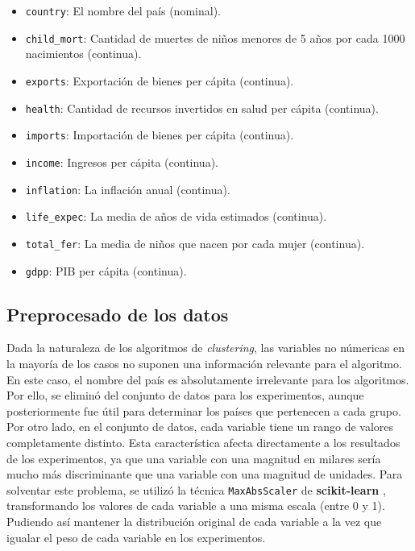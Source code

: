 \documentclass{article}
\begin{document}
\begin{itemize}
  \item \verb|country|: El nombre del país (nominal).
  \item \verb|child_mort|: Cantidad de muertes de niños menores de 5 años por cada 1000 nacimientos (continua).
  \item \verb|exports|: Exportación de bienes per cápita (continua).
  \item \verb|health|: Cantidad de recursos invertidos en salud per cápita (continua).
  \item \verb|imports|: Importación de bienes per cápita (continua).
  \item \verb|income|: Ingresos per cápita (continua).
  \item \verb|inflation|: La inflación anual (continua).
  \item \verb|life_expec|: La media de años de vida estimados (continua).
  \item \verb|total_fer|: La media de niños que nacen por cada mujer (continua).
  \item \verb|gdpp|: PIB per cápita (continua).
\end{itemize}

\subsection{Preprocesado de los datos}

\noindent Dada la naturaleza de los algoritmos de \textit{clustering}, las variables no númericas en la mayoría de los casos no suponen una información relevante para el algoritmo.
En este caso, el nombre del país es absolutamente irrelevante para los algoritmos.
Por ello, se eliminó del conjunto de datos para los experimentos, aunque posteriormente fue útil para determinar los países que pertenecen a cada grupo.\\

\noindent Por otro lado, en el conjunto de datos, cada variable tiene un rango de valores completamente distinto.
Esta característica afecta directamente a los resultados de los experimentos, ya que una variable con una magnitud en milares sería mucho más discriminante que una variable con una magnitud de unidades.
Para solventar este problema, se utilizó la técnica \verb|MaxAbsScaler| de \textbf{scikit-learn} \cite{sklearn_api},
transformando los valores de cada variable a una misma escala (entre 0 y 1).
Pudiendo así mantener la distribución original de cada variable a la vez que igualar el peso de cada variable en los experimentos.
\end{document}
